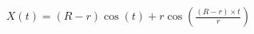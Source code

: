 \documentclass[preview]{standalone}
\begin{document}
\begin{align*}
X(t) = (R - r) \cos(t) + r \cos\left(\frac{(R - r)\times t}{r}\right)
\end{align*}
\end{document}
